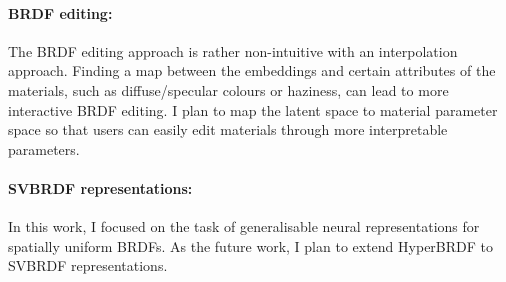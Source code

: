 \paragraph{BRDF editing:} The \gls{BRDF} editing approach is rather non-intuitive with an interpolation approach. Finding a map between the embeddings and certain attributes of the materials, such as diffuse/specular colours or haziness, can lead to more interactive \gls{BRDF} editing. I plan to map the latent space to material parameter space so that users can easily edit materials through more interpretable parameters.

\paragraph{SVBRDF representations:} In this work, I focused on the task of generalisable neural representations for spatially uniform \gls{BRDF}s. As the future work, I plan to extend HyperBRDF to SVBRDF representations.
